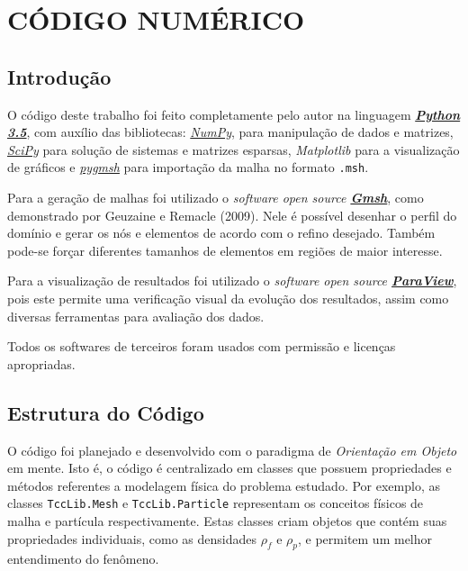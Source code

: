 \chapter{\textbf{CÓDIGO NUMÉRICO}}
\label{sec_codigo}

\section{\textbf{Introdução}}
O código deste trabalho foi feito completamente pelo autor na linguagem \href{https://www.python.org}{\textbf{\textit{Python 3.5}}}, com auxílio das bibliotecas: \href{https://www.numpy.org/}{\textit{NumPy}}, para manipulação de dados e matrizes, \href{https://www.scipy.org/}{\textit{SciPy}} para solução de sistemas e matrizes esparsas, \textit{Matplotlib} para a visualização de gráficos e \href{https://github.com/nschloe/pygmsh}{\textit{pygmsh}} para importação da malha no formato \verb|.msh|.

Para a geração de malhas foi utilizado o \textit{software open source \href{http://gmsh.info}{\textbf{Gmsh}}}, como demonstrado por Geuzaine e Remacle (2009)\cite{gmsh}.
Nele é possível desenhar o perfil do domínio e gerar os nós e elementos de acordo com o refino desejado.
Também pode-se forçar diferentes tamanhos de elementos em regiões de maior interesse.

Para a visualização de resultados foi utilizado o \textit{software open source \href{https://www.paraview.org/}{\textbf{ParaView}}}, pois este permite uma verificação visual da evolução dos resultados, assim como diversas ferramentas para avaliação dos dados.

Todos os softwares de terceiros foram usados com permissão e licenças apropriadas.

\section{\textbf{Estrutura do Código}}
O código foi planejado e desenvolvido com o paradigma de \textit{Orientação em Objeto} em mente.
Isto é, o código é centralizado em classes que possuem propriedades e métodos referentes a modelagem física do problema estudado.
Por exemplo, as classes \verb|TccLib.Mesh| e \verb|TccLib.Particle| representam os conceitos físicos de malha e partícula respectivamente.
Estas classes criam objetos que contém suas propriedades individuais, como as densidades $\rho_f$ e $\rho_p$, e permitem um melhor entendimento do fenômeno.

